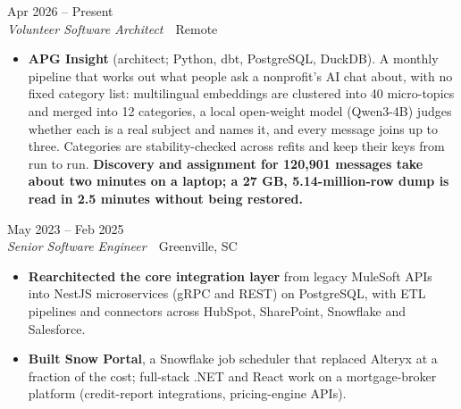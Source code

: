 \documentclass[10pt,letterpaper]{article}
\newcommand{\szmeta}{\fontsize{8pt}{10pt}\selectfont}
\begin{document}
\vspace{3pt}
 \hfill {\color{muted}\szmeta Apr 2026 – Present}\\[1pt]
{\itshape Volunteer Software Architect}{\color{muted}\ \textbullet\ Remote}
\vspace{2pt}
\begin{itemize}
\item \textbf{APG Insight} {\color{muted}(architect; Python, dbt, PostgreSQL, DuckDB)}. A monthly pipeline that works out what people ask a nonprofit's AI chat about, with no fixed category list: multilingual embeddings are clustered into 40 micro-topics and merged into 12 categories, a local open-weight model (Qwen3-4B) judges whether each is a real subject and names it, and every message joins up to three. Categories are stability-checked across refits and keep their keys from run to run. \textbf{Discovery and assignment for 120,901 messages take about two minutes on a laptop; a 27 GB, 5.14-million-row dump is read in 2.5 minutes without being restored.}
\end{itemize}
\vspace{3pt}
 \hfill {\color{muted}\szmeta May 2023 – Feb 2025}\\[1pt]
{\itshape Senior Software Engineer}{\color{muted}\ \textbullet\ Greenville, SC}
\vspace{2pt}
\begin{itemize}
\item \textbf{Rearchitected the core integration layer} from legacy MuleSoft APIs into NestJS microservices (gRPC and REST) on PostgreSQL, with ETL pipelines and connectors across HubSpot, SharePoint, Snowflake and Salesforce.
\item \textbf{Built Snow Portal}, a Snowflake job scheduler that replaced Alteryx at a fraction of the cost; full-stack .NET and React work on a mortgage-broker platform (credit-report integrations, pricing-engine APIs).
\end{itemize}
\end{document}
